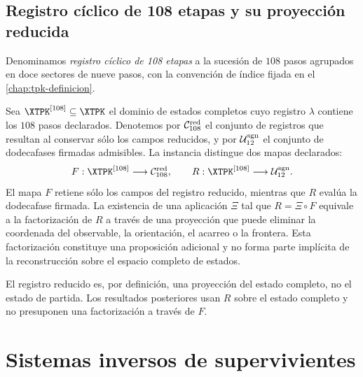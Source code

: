 \subsection{Registro cíclico de 108 etapas y su proyección reducida}

Denominamos \emph{registro cíclico de 108 etapas} a la sucesión de
\(108\) pasos agrupados en doce sectores de nueve pasos, con la convención de
índice fijada en el \cref{chap:tpk-definicion}.

Sea \(\XTPK^{[108]}\subseteq\XTPK\) el dominio de estados completos cuyo
registro \(\lambda\) contiene los \(108\) pasos declarados. Denotemos por
\(\mathcal C_{108}^{\rm red}\) el conjunto de registros que resultan al
conservar sólo los campos reducidos, y por \(\mathcal U_{12}^{\rm sgn}\) el
conjunto de dodecafases firmadas admisibles. La instancia distingue dos mapas
declarados:
\[
F:\XTPK^{[108]}\longrightarrow\mathcal C_{108}^{\rm red},
\qquad
R:\XTPK^{[108]}\longrightarrow\mathcal U_{12}^{\rm sgn}.
\]
El mapa \(F\) retiene sólo los campos del registro reducido, mientras que
\(R\) evalúa la dodecafase firmada. La existencia de una aplicación \(\Xi\)
tal que \(R=\Xi\circ F\) equivale a la factorización de \(R\) a través de una
proyección que puede eliminar la coordenada del observable, la orientación,
el acarreo o la frontera. Esta factorización constituye una proposición
adicional y no forma parte implícita de la reconstrucción sobre el espacio
completo de estados.

El registro reducido es, por definición, una proyección del estado completo,
no el estado de partida. Los resultados posteriores usan \(R\) sobre el
estado completo y no presuponen una factorización a través de \(F\).

\section{Sistemas inversos de supervivientes}

